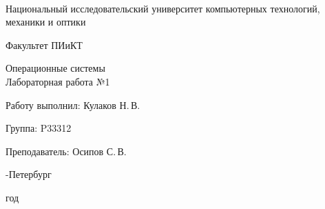 \thispagestyle{empty}

\onecolumn
\begin{center}
	\
\vspace{1 cm}

\huge Национальный исследовательский университет компьютерных технологий, механики и оптики
\vspace{0.5cm}

\Huge Факультет ПИиКТ

\vspace{5cm}
\huge Операционные системы  \\
Лабораторная работа №1
\vspace{0.2cm}

\end{center}
\vspace{6 cm}

\begin{flushright}
\Large

Работу выполнил: Кулаков Н.\,В.
\smallskip

Группа: P33312
\smallskip

Преподаватель: Осипов С.\,В.
\smallskip

\vspace{4cm}
	
-Петербург

 год
\end{flushright}

